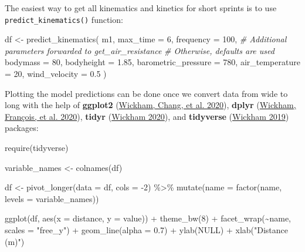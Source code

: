 \documentclass[fleqn,10pt,lineno]{wlpeerj} %
\newenvironment{Shaded}{\begin{snugshade}}{\end{snugshade}}
\newcommand{\AttributeTok}[1]{\textcolor[rgb]{0.77,0.63,0.00}{#1}}
\newcommand{\CommentTok}[1]{\textcolor[rgb]{0.56,0.35,0.01}{\textit{#1}}}
\newcommand{\ConstantTok}[1]{\textcolor[rgb]{0.00,0.00,0.00}{#1}}
\newcommand{\DecValTok}[1]{\textcolor[rgb]{0.00,0.00,0.81}{#1}}
\newcommand{\FloatTok}[1]{\textcolor[rgb]{0.00,0.00,0.81}{#1}}
\newcommand{\FunctionTok}[1]{\textcolor[rgb]{0.00,0.00,0.00}{#1}}
\newcommand{\NormalTok}[1]{#1}
\newcommand{\OtherTok}[1]{\textcolor[rgb]{0.56,0.35,0.01}{#1}}
\newcommand{\SpecialCharTok}[1]{\textcolor[rgb]{0.00,0.00,0.00}{#1}}
\newcommand{\StringTok}[1]{\textcolor[rgb]{0.31,0.60,0.02}{#1}}
\begin{document}
The easiest way to get all kinematics and kinetics for short sprints is to use \texttt{predict\_kinematics()} function:

\begin{Shaded}
\begin{Highlighting}[]
\NormalTok{df }\OtherTok{\textless{}{-}} \FunctionTok{predict\_kinematics}\NormalTok{(}
\NormalTok{  m1,}
  \AttributeTok{max\_time =} \DecValTok{6}\NormalTok{,}
  \AttributeTok{frequency =} \DecValTok{100}\NormalTok{,}
  \CommentTok{\# Additional parameters forwarded to get\_air\_resistance}
  \CommentTok{\# Otherwise, defaults are used}
  \AttributeTok{bodymass =} \DecValTok{80}\NormalTok{,}
  \AttributeTok{bodyheight =} \FloatTok{1.85}\NormalTok{,}
  \AttributeTok{barometric\_pressure =} \DecValTok{780}\NormalTok{,}
  \AttributeTok{air\_temperature =} \DecValTok{20}\NormalTok{,}
  \AttributeTok{wind\_velocity =} \FloatTok{0.5}
\NormalTok{)}
\end{Highlighting}
\end{Shaded}

Plotting the model predictions can be done once we convert data from wide to long with the help of \textbf{ggplot2} (\protect\hyperlink{ref-R-ggplot2}{Wickham, Chang, et al. 2020}), \textbf{dplyr} (\protect\hyperlink{ref-R-dplyr}{Wickham, François, et al. 2020}), \textbf{tidyr} (\protect\hyperlink{ref-R-tidyr}{Wickham 2020}), and \textbf{tidyverse} (\protect\hyperlink{ref-R-tidyverse}{Wickham 2019}) packages:

\begin{Shaded}
\begin{Highlighting}[]
\FunctionTok{require}\NormalTok{(tidyverse)}

\NormalTok{variable\_names }\OtherTok{\textless{}{-}} \FunctionTok{colnames}\NormalTok{(df)}

\NormalTok{df }\OtherTok{\textless{}{-}} \FunctionTok{pivot\_longer}\NormalTok{(}\AttributeTok{data =}\NormalTok{ df, }\AttributeTok{cols =} \SpecialCharTok{{-}}\DecValTok{2}\NormalTok{) }\SpecialCharTok{\%\textgreater{}\%}
  \FunctionTok{mutate}\NormalTok{(}\AttributeTok{name =} \FunctionTok{factor}\NormalTok{(name, }\AttributeTok{levels =}\NormalTok{ variable\_names))}

\FunctionTok{ggplot}\NormalTok{(df, }\FunctionTok{aes}\NormalTok{(}\AttributeTok{x =}\NormalTok{ distance, }\AttributeTok{y =}\NormalTok{ value)) }\SpecialCharTok{+}
  \FunctionTok{theme\_bw}\NormalTok{(}\DecValTok{8}\NormalTok{) }\SpecialCharTok{+}
  \FunctionTok{facet\_wrap}\NormalTok{(}\SpecialCharTok{\textasciitilde{}}\NormalTok{name, }\AttributeTok{scales =} \StringTok{"free\_y"}\NormalTok{) }\SpecialCharTok{+}
  \FunctionTok{geom\_line}\NormalTok{(}\AttributeTok{alpha =} \FloatTok{0.7}\NormalTok{) }\SpecialCharTok{+}
  \FunctionTok{ylab}\NormalTok{(}\ConstantTok{NULL}\NormalTok{) }\SpecialCharTok{+}
  \FunctionTok{xlab}\NormalTok{(}\StringTok{"Distance (m)"}\NormalTok{)}
\end{Highlighting}
\end{Shaded}
\end{document}
